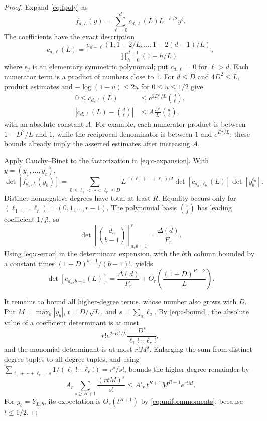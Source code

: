 \documentclass[11pt]{article}
\numberwithin{equation}{section}
\theoremstyle{definition}
\newcommand{\vander}{\Delta}
\begin{document}
\begin{proof}
Expand \eqref{eq:fpoly} as
\begin{equation}\label{eq:c-expansion}
 f_{d,L}(y)=\sum_{\ell=0}^{d}c_{d,\ell}(L)L^{-\ell/2}y^\ell.
\end{equation}
The coefficients have the exact description
\[
 c_{d,\ell}(L)=
 \frac{e_{d-\ell}(1,1-2/L,\ldots,1-2(d-1)/L)}
      {\prod_{h=0}^{d-1}(1-h/L)},
\]
where $e_j$ is an elementary symmetric polynomial; put $c_{d,\ell}=0$ for $\ell>d$. Each numerator term is a product of numbers close to $1$. For $d\leq D$ and $4D^2\leq L$, product estimates and $-\log(1-u)\leq2u$ for $0\leq u\leq1/2$ give
\begin{align}
 0\leq c_{d,\ell}(L)&\leq e^{2D^2/L}\binom d\ell,\label{eq:c-bound}\\
 \left|c_{d,\ell}(L)-\binom d\ell\right|
 &\leq A\frac{D^2}{L}\binom d\ell,\label{eq:c-error}
\end{align}
with an absolute constant $A$. For example, each numerator product is between $1-D^2/L$ and $1$, while the reciprocal denominator is between $1$ and $e^{D^2/L}$; these bounds already imply the asserted estimates after increasing $A$.

Apply Cauchy--Binet to the factorization in \eqref{eq:c-expansion}. With $y=(y_1,\ldots,y_r)$,
\begin{equation}\label{eq:degree-expansion}
 \det[f_{d_a,L}(y_b)]
 =\sum_{0\leq\ell_1<\cdots<\ell_r\leq D}
 L^{-(\ell_1+\cdots+\ell_r)/2}
 \det[c_{d_a,\ell_b}(L)]\det[y_b^{\ell_a}].
\end{equation}
Distinct nonnegative degrees have total at least $R$. Equality occurs only for
$(\ell_1,\ldots,\ell_r)=(0,1,\ldots,r-1)$. The polynomial basis $\binom{x}{j}$ has leading coefficient $1/j!$, so
\begin{equation}\label{eq:binom-vander}
 \det\left[\binom{d_a}{b-1}\right]_{a,b=1}^r
 =\frac{\vander(d)}{F_r}.
\end{equation}
Using \eqref{eq:c-error} in the determinant expansion, with the $b$th column bounded by a constant times $(1+D)^{b-1}/(b-1)!$, yields
\begin{equation}\label{eq:leading-error}
 \det[c_{d_a,b-1}(L)]
 =\frac{\vander(d)}{F_r}
   +O_r\!\left(\frac{(1+D)^{R+2}}{L}\right).
\end{equation}

It remains to bound all higher-degree terms, whose number also grows with $D$. Put $M=\max_b|y_b|$, $t=D/\sqrt L$, and $s=\sum_a\ell_a$. By \eqref{eq:c-bound}, the absolute value of a coefficient determinant is at most
\[
 r!e^{2rD^2/L}\frac{D^s}{\ell_1!\cdots\ell_r!},
\]
and the monomial determinant is at most $r!M^s$. Enlarging the sum from distinct degree tuples to all degree tuples, and using
$\sum_{\ell_1+\cdots+\ell_r=s}1/(\ell_1!\cdots\ell_r!)=r^s/s!$, bounds the higher-degree remainder by
\begin{equation}\label{eq:tail-polynomial}
 A_r\sum_{s\geq R+1}\frac{(rtM)^s}{s!}
 \leq A'_r\,t^{R+1}M^{R+1}e^{rtM}.
\end{equation}
For $y_b=Y_{L,b}$, its expectation is $O_r(t^{R+1})$ by \eqref{eq:uniformmoments}, because $t\leq1/2$.


\end{proof}
\end{document}

